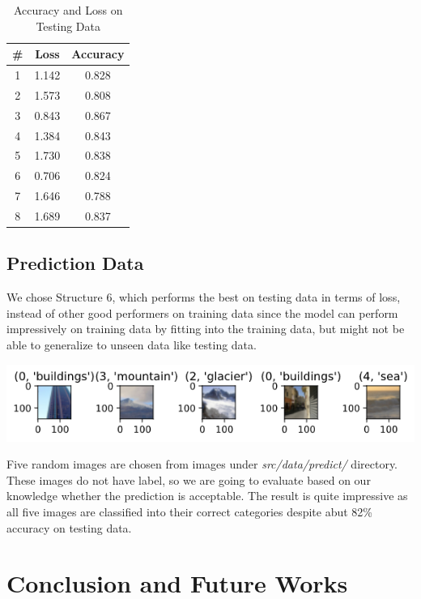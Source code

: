 \documentclass{article}
\begin{document}
\begin{table}[h]
    \centering
    \begin{tabular}{|c|c|c|}
    \hline
    \#&Loss&Accuracy\\
    \hline
    1&1.142&0.828\\
    \hline
    2&1.573&0.808\\
    \hline
    3&0.843&0.867\\
    \hline
    4&1.384&0.843\\
    \hline
    5&1.730&0.838\\
    \hline
    6&0.706&0.824\\
    \hline
    7&1.646&0.788\\
    \hline
    8&1.689&0.837\\
    \hline
    \end{tabular}
    \caption{Accuracy and Loss on Testing Data}
    \label{t3:acc_loss_test_tab}
\end{table}

\subsection{Prediction Data}

We chose Structure 6, which performs the best on testing data in terms of loss, instead of other good performers on training data since the model can perform impressively on training data by fitting into the training data, but might not be able to generalize to unseen data like testing data.

\begin{center}
    \includegraphics[scale=0.68]{assets/s6.png}
\end{center}

Five random images are chosen from images under \textit{src/data/predict/} directory. These images do not have label, so we are going to evaluate based on our knowledge whether the prediction is acceptable. The result is quite impressive as all five images are classified into their correct categories despite abut 82\% accuracy on testing data.


\section{Conclusion and Future Works}
\end{document}
